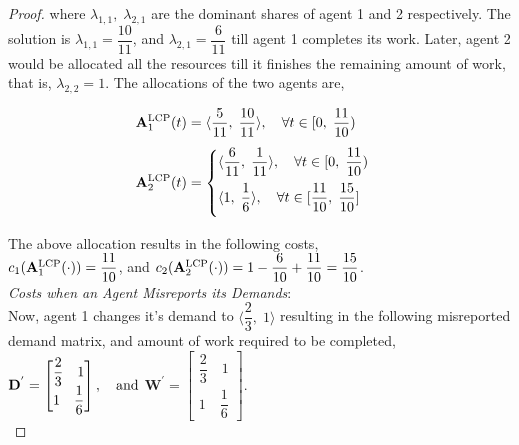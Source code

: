 \documentclass[letterpaper]{article} %
\theoremstyle{definition}
\begin{document}
\begin{proof}
\noindent where $\lambda_{1,1},\; \lambda_{2,1}$ are the dominant shares of agent 1 and 2 respectively. The solution is $\lambda_{1,1} = \dfrac{10}{11}$, and $\lambda_{2,1} = \dfrac{6}{11}$ till agent 1 completes its work. Later, agent 2 would be allocated all the resources till it finishes the remaining amount of work, that is, $\lambda_{2,2} = 1$. The allocations of the two agents are,
\begin{linenomath}
\begin{equation*}
\begin{split}
\mathbf{A}^{\textnormal{LCP}}_{1}(t) & = \langle \dfrac{5}{11}, \; \dfrac{10}{11} \rangle, \quad \forall t \in [0, \; \dfrac{11}{10}) \\[4 pt]    
\mathbf{A}^{\textnormal{LCP}}_{2}(t) & = \begin{cases}
\langle \dfrac{6}{11}, \; \dfrac{1}{11} \rangle, \quad \forall t \in [0, \; \dfrac{11}{10})\\[8 pt]
\langle 1, \; \dfrac{1}{6} \rangle, \quad \forall t \in [\dfrac{11}{10}, \; \dfrac{15}{10}] \\[8 pt]
\end{cases}
\end{split}    
\end{equation*}
\end{linenomath}

\noindent The above allocation results in the following costs, \\ $c_{1}(\mathbf{A}^{\textnormal{LCP}}_{1}(\cdot)) = \dfrac{11}{10}$, and $c_{2}(\mathbf{A}^{\textnormal{LCP}}_{2}(\cdot)) = 1 - \dfrac{6}{10} + \dfrac{11}{10} = \dfrac{15}{10}$. \\[12 pt]

\noindent \textit{Costs when an Agent Misreports its Demands}:\\ \noindent Now, agent 1 changes it's demand to $\langle \dfrac{2}{3},\; 1 \rangle$ resulting in the following misreported demand matrix, and amount of work required to be completed, \\
$\mathbf{D}^{'} = \begin{bmatrix} \dfrac{2}{3} \quad 1 \\1 \quad \dfrac{1}{6} \end{bmatrix}, \quad \textnormal{and}$
$\mathbf{W}^{'} = \begin{bmatrix} \dfrac{2}{3} \quad 1 \\1 \quad \dfrac{1}{6} \end{bmatrix}$.\\


\end{proof}
\end{document}
